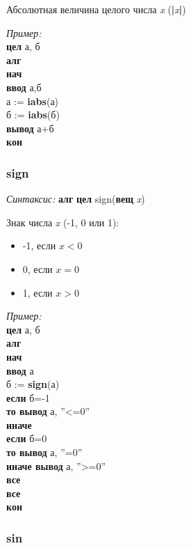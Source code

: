      
 
      Абсолютная величина целого числа \emph{x} (\textbf{|}\emph{x}\textbf{|})
      
\emph{Пример:} 
\sffamily
~\\\textbf{цел} а, б
~\\\textbf{алг
~\\нач
~\\\otstup ввод} а,б
~\\\otstup а := \textbf{iabs}(а)
~\\\otstup б := \textbf{iabs}(б)
~\\\otstup \textbf{вывод} а+б
~\\\textbf{кон}

\normalfont
\subsubsection{sign}

\emph{Синтаксис:} \textbf{алг} \textbf{цел} sign(\textbf{вещ} \emph{x})


      

      Знак числа \emph{x} (-1, 0 или 1):
\begin{itemize}
\item      -1, если $x < 0$
\item      0, если  $x=0$
\item      1, если $x>0$
\end{itemize}
 
\emph{Пример:}
\sffamily
~\\\textbf{цел} а, б
~\\\textbf{алг 
~\\нач
~\\\otstup ввод} а
~\\\otstup б := \textbf{sign}(а)
~\\\otstup \textbf{если} б=-1
~\\\otstup \otstup \textbf{то вывод} а, ''<=0''
~\\\otstup \otstup  \textbf{иначе 
~\\\otstup \otstup \otstup  если} б=0
~\\\otstup \otstup \otstup \otstup  \textbf{то вывод} а, ''=0''
~\\\otstup \otstup \otstup \otstup  \textbf{иначе вывод} а, ''>=0''
~\\\otstup \otstup \otstup \textbf{все
~\\\otstup все
~\\кон}

\normalfont
\subsubsection{sin}

